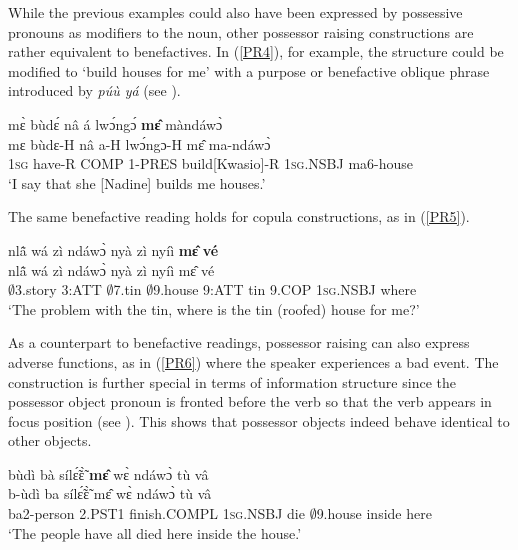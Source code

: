 While the previous examples could also have been expressed by possessive pronouns as modifiers to the noun, other possessor raising constructions are rather equivalent to benefactives. In (\ref{PR4}), for example, the structure could be modified to `build houses for me' with a purpose or benefactive oblique phrase introduced by {\itshape púù yá} (see ). 

\begin{exe} 
\ex\label{PR4} 
  \glll mɛ̀ bùdɛ́ nâ á lwɔ́ngɔ́ {\bfseries mɛ̂} màndáwɔ̀\\
        mɛ bùdɛ-H nâ a-H lwɔ́ngɔ-H mɛ̂ ma-ndáwɔ̀ \\
       1\textsc{sg} have-R COMP 1-PRES build[Kwasio]-R 1\textsc{sg}.NSBJ ma6-house   \\
    \trans `I say that she [Nadine] builds me houses.'
\end{exe}

\noindent The same benefactive reading holds for copula constructions, as in (\ref{PR5}).

\begin{exe} 
\ex\label{PR5}
  \glll     nlã̂ wá zì ndáwɔ̀ nyà zì nyíì {\bfseries mɛ̂} {\bfseries vé} \\
          nlã̂ wá zì ndáwɔ̀ nyà zì nyíì mɛ̂ vé \\
              $\emptyset$3.story 3:ATT $\emptyset$7.tin $\emptyset$9.house 9:ATT tin 9.COP 1\textsc{sg}.NSBJ where \\
    \trans `The problem with the tin, where is the tin (roofed) house for me?'
\end{exe}

As a counterpart to benefactive readings, possessor raising can also express adverse functions, as in (\ref{PR6}) where the speaker experiences a bad event. The construction is further special in terms of information structure since the possessor object pronoun is fronted before the verb so that the verb appears in focus position (see ). This shows that possessor objects indeed behave identical to other objects.

\begin{exe} 
\ex\label{PR6}
  \glll bùdì bà sílɛ̃́ɛ̃̀ {\bfseries mɛ̂} wɛ̀ ndáwɔ̀ tù vâ \\
        b-ùdì ba sílɛ̃́ɛ̃̀ mɛ̂ wɛ̀ ndáwɔ̀ tù vâ \\
       ba2-person 2.PST1 finish.COMPL 1\textsc{sg}.NSBJ die $\emptyset$9.house inside here  \\
    \trans `The people have all died here inside the house.'
\end{exe}







